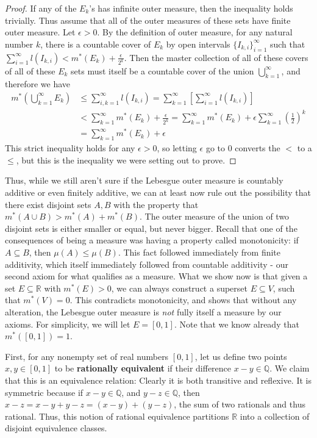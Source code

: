 \documentclass{article}
\theoremstyle{definition}
\theoremstyle{plain}
\theoremstyle{theorem}
\begin{document}
\begin{proof}
	If any of the $E_k$'s  has infinite outer measure, then the inequality holds trivially. Thus assume that all of the outer measures of these sets have finite outer measure. Let $\epsilon > 0$. By the definition of outer measure, for any natural number $k$, there is a countable cover of $E_k$ by open intervals $\{I_{k,i}\}_{i=1}^{\infty}$ such that $\sum_{i=1}^{\infty}l(I_{k,i}) < m^*(E_k)+\frac{\epsilon}{2^k}$. Then the master collection of all of these covers of all of these $E_k$ sets must itself be a countable cover of the union $\bigcup_{k=1}^{\infty}$, and therefore we have
\begin{align*}
	m^*\left( \bigcup_{k=1}^{\infty} E_k \right) &\leq \sum_{i,k=1}^{\infty} l(I_{k,i}) = \sum_{k=1}^{\infty}\left[\sum_{i=1}^{\infty} l(I_{k,i}) \right] \\
		&< \sum_{k=1}^{\infty} m^*(E_k)+\frac{\epsilon}{2^k} = \sum_{k=1}^{\infty} m^*(E_k)+\epsilon\sum_{k=1}^{\infty}(\frac{1}{2})^k \\
		&= \sum_{k=1}^{\infty} m^*(E_k) + \epsilon
\end{align*} 
This strict inequality holds for any $\epsilon > 0$, so letting $\epsilon$ go to $0$ converts the $<$ to a $\leq$, but this is the inequality we were setting out to prove.
\end{proof}
Thus, while we still aren't sure if the Lebesgue outer measure is countably additive or even finitely additive, we can at least now rule out the possibility that there exist disjoint sets $A,B$ with the property that $m^*(A \cup B) > m^*(A)+m^*(B)$. The outer measure of the union of two disjoint sets is either smaller or equal, but never bigger. 
Recall that one of the consequences of being a measure was having a property called monotonicity: if $A \subseteq B$, then $\mu(A) \leq \mu(B)$. This fact followed immediately from finite additivity, which itself immediately followed from countable additivity - our second axiom for what qualifies as a measure. What we show now is that given a set $E \subseteq \mathbb{R}$ with $m^*(E) > 0$, we can always construct a superset $E \subseteq V$, such that $m^*(V) = 0$. This contradicts monotonicity, and shows that without any alteration, the Lebesgue outer measure is \textit{not} fully itself a measure by our axioms. For simplicity, we will let $E = [0,1]$. Note that we know already that $m^*([0,1]) = 1$. \par
First, for any nonempty set of real numbers $[0,1]$, let us define two points $x,y \in [0,1]$ to be \textbf{rationally equivalent} if their difference $x-y \in \mathbb{Q}$. We claim that this is an equivalence relation: Clearly it is both transitive and reflexive. It is symmetric because if $x-y \in \mathbb{Q}$, and $y-z \in \mathbb{Q}$, then $x-z = x-y+y-z = (x-y)+(y-z)$, the sum of two rationals and thus rational. Thus, this notion of rational equivalence partitions $\mathbb{R}$ into a collection of disjoint equivalence classes. \par
\end{document}
